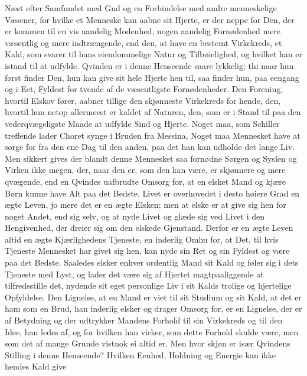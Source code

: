 \documentclass[12pt,a4paper]{book}
\newcommand{\apage}[1]{\marginnote{\footnotesize\textit{[#1]}}}
\begin{document}
Næst efter Samfundet med Gud og en Forbindelse med andre menneskelige
Væsener, for hvilke et Menneske kan aabne sit Hjerte, er der neppe for
Den, der er kommen til en vis aandelig Modenhed, nogen aandelig
Fornødenhed mere væsentlig og mere indtrængende, end den, at have en
bestemt Virkekreds, et Kald, som svarer til hans eiendommelige Natur og
Tilbøielighed, og hvilket han er istand til at udfylde. Qvinden er i
denne Henseende saare lykkelig; thi naar hun først finder Den, hun kan
give sit hele Hjerte hen til, saa finder hun, paa eengang og i Eet,
Fyldest for tvende af de væsentligste Fornødenheder. Den Forening,
hvortil Elskov fører, aabner tillige den skjønneste Virkekreds for
hende, den, hvortil hun netop allermeest er kaldet af Naturen, den, som
er i Stand til paa den vederqvægeligste Maade at udfylde Sind og Hjerte.
Noget maa, som Schiller treffende lader Choret synge i \apage{105} Bruden fra
Messina, Noget maa Mennesket have at sørge for fra den ene Dag til den
anden, paa det han kan udholde det lange Liv. Men sikkert gives der
blandt denne Mennesket saa fornødne Sørgen og Syslen og Virken ikke
megen, der, naar den er, som den kan være, er skjønnere og mere
qvægende, end en Qvindes uafbrudte Omsorg for, at en elsket Mand og
kjære Børn kunne have Alt paa det Bedste. Livet er overhovedet i desto
høiere Grad en ægte Leven, jo mere det er en ægte Elsken; men at elske
er at give sig hen for noget Andet, end sig selv, og at nyde Livet og
glæde sig ved Livet i den Hengivenhed, der dreier sig om den elskede
Gjenstand. Derfor er en ægte Leven altid en ægte Kjærlighedens Tjeneste,
en inderlig Omhu for, at Det, til hvis Tjeneste Mennesket har givet sig
hen, kan nyde sin Ret og sin Fyldest og være paa det Bedste. Saaledes
elsker enhver ordentlig Mand sit Kald og føler sig i dets Tjeneste med
Lyst, og lader det være sig af Hjertet magtpaaliggende at tilfredsstille
det, nydende sit eget personlige Liv i sit Kalds trolige og hjertelige
Opfyldelse. Den Lignelse, at eu Mand er viet til sit Studium og sit
Kald, at det er ham som en Brud, han inderlig elsker og drager Omsorg
for, er en Lignelse, der er af Betydning og der udtrykker Mandens
Forhold til sin Virkekreds og til den Idee, han ledes af, og for hvilken
han virker, som dette Forhold skulde være, men som det af mange Grunde
vistnok ei altid er. Men hvor skjøn er især Qvindens Stilling \apage{106} i denne
Henseende? Hvilken Eenhed, Holdning og Energie kan ikke hendes Kald give
\end{document}
